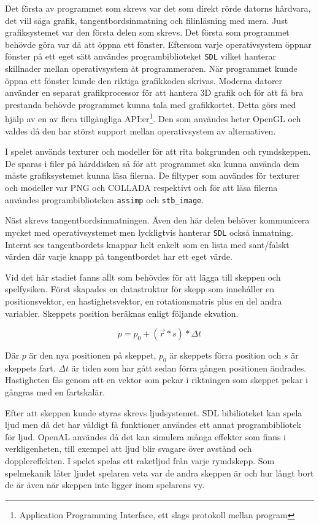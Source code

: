 \documentclass[12pt, a4paper]{article}
\newcommand{\code}{\texttt}
\begin{document}
	Det första av programmet som skrevs var det som direkt rörde datorns hårdvara, det vill säga grafik, tangentbordsinmatning och filinläsning med mera. Just grafiksystemet var den första delen som skrevs. Det första som programmet behövde göra var då att öppna ett fönster. Eftersom varje operativsystem öppnar fönster på ett eget sätt användes programbiblioteket \code{SDL} vilket hanterar skillnader mellan operativsystem åt programmeraren. När programmet kunde öppna ett fönster kunde den riktiga grafikkoden skrivas. Moderna datorer använder en separat grafikprocessor för att hantera 3D grafik och för att få bra prestanda behövde programmet kunna tala med grafikkortet. Detta görs med hjälp av en av flera tillgängliga API:er\footnote{Application Programming Interface, ett slags protokoll mellan program}. Den som användes heter OpenGL och valdes då den har störst support mellan operativsystem av alternativen. 
	
	I spelet används texturer och modeller för att rita bakgrunden och rymdskeppen. De sparas i filer på hårddisken så för att programmet ska kunna använda dem måste grafiksystemet kunna läsa filerna. De filtyper som användes för texturer och modeller var PNG och COLLADA respektivt och för att läsa filerna användes programbiblioteken \code{assimp} och \code{stb\_image}. 
	
	Näst skrevs tangentbordsinmatningen. Även den här delen behöver kommunicera mycket med operativsystemet men lyckligtvis hanterar \code{SDL} också inmatning. Internt ses tangentbordets knappar helt enkelt som en lista med sant/falskt värden där varje knapp på tangentbordet har ett eget värde. 
	
	Vid det här stadiet fanns allt som behövdes för att lägga till skeppen och spelfysiken. Först skapades en datastruktur för skepp som innehåller en positionsvektor, en hastighetsvektor, en rotationsmatris plus en del andra variabler. Skeppets position beräknas enligt följande ekvation. 
	
	\begin{equation}
		p = p_0 + (\vec{r} * s) * \Delta t
	\end{equation}
	
	Där $p$ är den nya positionen på skeppet, $p_0$ är skeppets förra position och $s$ är skeppets fart. $\Delta t$ är tiden som har gått sedan förra gången positionen ändrades. Hastigheten fås genom att en vektor som pekar i riktningen som skeppet pekar i gångras med en fartskalär. 
	
	Efter att skeppen kunde styras skrevs ljudsystemet. SDL bibilioteket kan spela ljud men då det har väldigt få funktioner användes ett annat programbibliotek för ljud. OpenAL användes då det kan simulera många effekter som finns i verkligenheten, till exempel att ljud blir svagare över avstånd och dopplereffekten. I spelet spelas ett raketljud från varje rymdskepp. Som spelmekanik låter ljudet spelaren veta var de andra skeppen är och hur långt bort de är även när skeppen inte ligger inom spelarens vy. 
	
\end{document}
